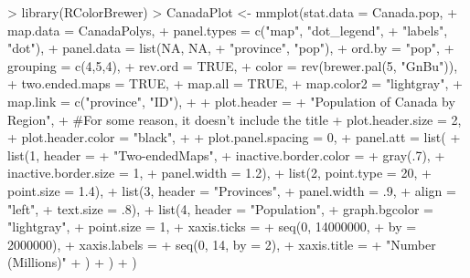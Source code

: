 \documentclass[12pt,letterpaper,final]{article}
\begin{document}
\begin{enumerate}
\begin{enumerate}
\begin{Schunk}
\begin{Sinput}
> library(RColorBrewer)
> CanadaPlot <- mmplot(stat.data = Canada.pop,
+                     map.data = CanadaPolys,
+                     panel.types = c("map", "dot_legend",
+                                     "labels", "dot"),
+                     panel.data = list(NA, NA, 
+                                       "province", "pop"),
+                     ord.by = "pop",
+                     grouping = c(4,5,4),
+                     rev.ord = TRUE,
+                     color = rev(brewer.pal(5, "GnBu")),
+                     two.ended.maps = TRUE,
+                     map.all = TRUE,
+                     map.color2 = "lightgray",
+                     map.link = c("province", "ID"),
+                     
+                     plot.header = 
+                       "Population of Canada by Region",
+       #For some reason, it doesn't include the title
+                     plot.header.size = 2,
+                     plot.header.color = "black",
+                     
+                     plot.panel.spacing = 0,
+                     panel.att = list(
+                       list(1, header = 
+                              "Two-ended\nCumulative Maps",
+                            inactive.border.color = 
+                              gray(.7), 
+                            inactive.border.size = 1,
+                            panel.width = 1.2),
+                       list(2, point.type = 20,
+                            point.size = 1.4),
+                       list(3, header = "Provinces", 
+                            panel.width = .9,
+                            align = "left", 
+                            text.size = .8),
+                       list(4, header = "Population",
+                            graph.bgcolor = "lightgray", 
+                            point.size = 1,
+                            xaxis.ticks = 
+                              seq(0, 14000000, 
+                                  by = 2000000), 
+                            xaxis.labels = 
+                              seq(0, 14, by = 2),
+                            xaxis.title = 
+                              "Number (Millions)"
+                       )
+                     )
+ )
\end{Sinput}
\end{Schunk}

\end{enumerate}
\end{enumerate}
\end{document}
